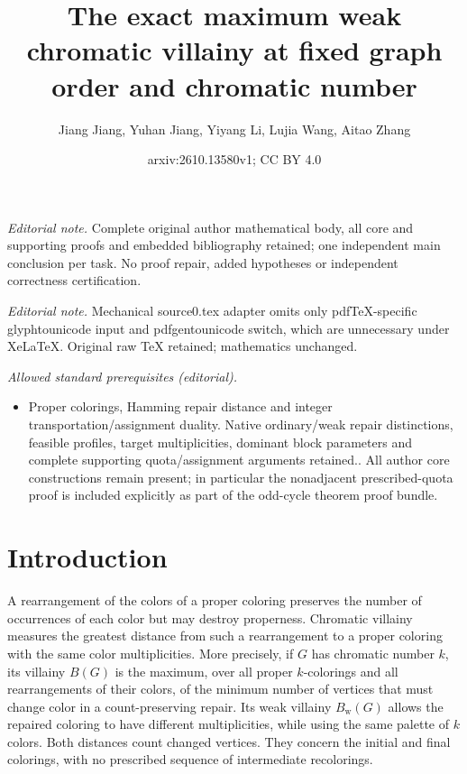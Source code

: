 \documentclass[10pt,a4paper]{amsart}
\title{The exact maximum weak chromatic villainy at fixed graph order and chromatic number}
\author{Jiang Jiang, Yuhan Jiang, Yiyang Li, Lujia Wang, Aitao Zhang}
\date{arxiv:2610.13580v1; CC BY 4.0}
\numberwithin{equation}{section}
\theoremstyle{definition}
\theoremstyle{remark}
\begin{document}
\maketitle
\noindent\textit{Editorial note.} Complete original author mathematical body, all core and supporting proofs and embedded bibliography retained; one independent main conclusion per task. No proof repair, added hypotheses or independent correctness certification.\par\medskip
\noindent\textit{Editorial note.} Mechanical source0.tex adapter omits only pdfTeX-specific glyphtounicode input and pdfgentounicode switch, which are unnecessary under XeLaTeX. Original raw TeX retained; mathematics unchanged.\par\medskip
\noindent\textit{Allowed standard prerequisites (editorial).}\begin{itemize}
\item Proper colorings, Hamming repair distance and integer transportation/assignment duality. Native ordinary/weak repair distinctions, feasible profiles, target multiplicities, dominant block parameters and complete supporting quota/assignment arguments retained.. All author core constructions remain present; in particular the nonadjacent prescribed-quota proof is included explicitly as part of the odd-cycle theorem proof bundle.
\end{itemize}\medskip
\section{Introduction}

A rearrangement of the colors of a proper coloring preserves the number
of occurrences of each color but may destroy properness. Chromatic
villainy measures the greatest distance from such a rearrangement to a
proper coloring with the same color multiplicities. More precisely, if
$G$ has chromatic number $k$, its villainy $B(G)$ is the maximum, over
all proper $k$-colorings and all rearrangements of their colors, of the
minimum number of vertices that must change color in a count-preserving
repair. Its weak villainy $B_{\mathrm w}(G)$ allows the repaired
coloring to have different multiplicities, while using the same palette
of $k$ colors. Both distances count changed vertices. They concern the
initial and final colorings, with no prescribed sequence of intermediate
recolorings.
\end{document}
